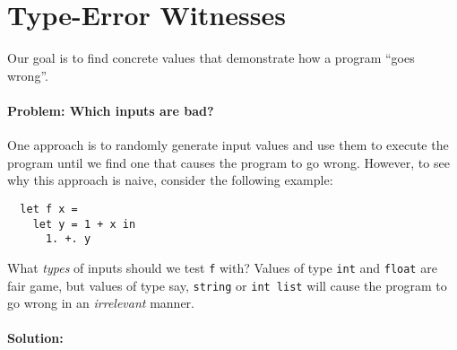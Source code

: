 \section{Type-Error Witnesses}
\label{sec:searching-witness}

Our goal is to find concrete values that demonstrate how a
program ``goes wrong''.

\paragraph{Problem: Which inputs are bad?}
%
One approach is to randomly generate input values and use
them to execute the program until we find one that causes
the program to go wrong. However, to see why this approach
is naive, consider the following example:
%
\begin{lstlisting}
  let f x =
    let y = 1 + x in
      1. +. y
\end{lstlisting}
%
What \emph{types} of inputs should we test \texttt{f} with?
Values of type \texttt{int} and \texttt{float} are fair game,
but values of type say, \texttt{string} or \texttt{int list}
will cause the program to go wrong in an \emph{irrelevant}
manner.

\paragraph{Solution:} 


%


